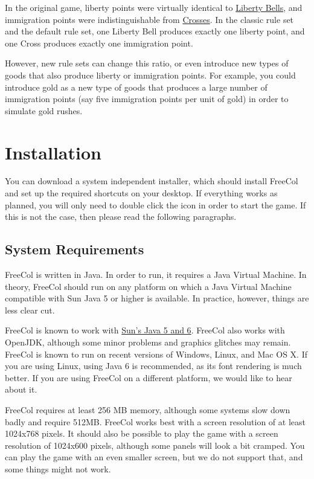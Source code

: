 \documentclass[12pt]{book}
\begin{document}
In the original game, liberty points were virtually identical to
\hyperlink{Liberty Bells}{Liberty Bells}, and immigration points were
indistinguishable from \hyperlink{Crosses}{Crosses}. In the classic
rule set and the default rule set, one Liberty Bell produces exactly
one liberty point, and one Cross produces exactly one immigration
point.

However, new rule sets can change this ratio, or even introduce new
types of goods that also produce liberty or immigration points. For
example, you could introduce gold as a new type of goods that produces
a large number of immigration points (say five immigration points per
unit of gold) in order to simulate gold rushes.



\hypertarget{Installation}{\chapter{Installation}}

You can download a system independent installer, which should install
FreeCol and set up the required shortcuts on your desktop. If
everything works as planned, you will only need to double click the
icon in order to start the game. If this is not the case, then please
read the following paragraphs.

\hypertarget{System Requirements}{\section{System Requirements}}

FreeCol is written in Java. In order to run, it requires a Java
Virtual Machine. In theory, FreeCol should run on any platform on
which a Java Virtual Machine compatible with Sun Java 5 or higher is
available. In practice, however, things are less clear cut.

FreeCol is known to work with \href{http://java.sun.com/}{Sun's Java 5
  and 6}. FreeCol also works with OpenJDK, although some minor
problems and graphics glitches may remain. FreeCol is known to run on
recent versions of Windows, Linux, and Mac OS X. If you are using
Linux, using Java 6 is recommended, as its font rendering is much
better. If you are using FreeCol on a different platform, we would
like to hear about it.

FreeCol requires at least 256 MB memory, although some systems slow
down badly and require 512MB.  FreeCol works best with a screen
resolution of at least 1024x768 pixels. It should also be possible to
play the game with a screen resolution of 1024x600 pixels, although
some panels will look a bit cramped. You can play the game with an
even smaller screen, but we do not support that, and some things might
not work.
\end{document}
